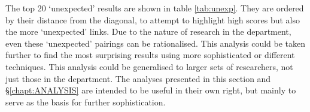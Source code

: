 The top 20 `unexpected' results are shown in table \ref{tab:unexp}. They are ordered by their distance from the diagonal, to attempt to highlight high scores but also the more `unexpected' links.
Due to the nature of research in the department, even these `unexpected' pairings can be rationalised. This analysis could be taken further to find the most surprising results using more sophisticated or different techniques. This analysis could be generalised to larger sets of researchers, not just those in the department. The analyses presented in this section and \S\ref{chapt:ANALYSIS} are intended to be useful in their own right, but mainly to serve as the basis for further sophistication.
